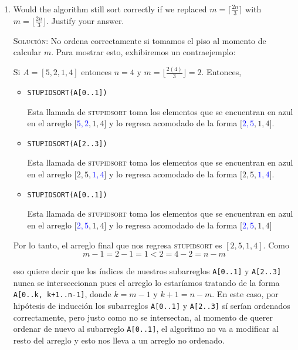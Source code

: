\documentclass[letterpaper,11pt]{article}
\begin{document}
\begin{enumerate}
\begin{enumerate}
\begin{proof}
        \end{proof}

        \item Would the algorithm still sort correctly if we replaced 
        $m = \lceil \frac{2n}{3}\rceil$ with $m = \lfloor \frac{2n}{3} \rfloor$. 
        Justify your answer.

        \textsc{Solución:} No ordena correctamente si tomamos el piso al momento 
        de calcular $m$. Para mostrar esto, exhibiremos un contraejemplo:

        Si $A = [5, 2, 1, 4]$ entonces $n = 4$ y $m = \lfloor \frac{2(4)}{3} 
        \rfloor = 2$. Entonces,
        \begin{itemize}
            \item \texttt{STUPIDSORT(A[0..1])}

            Esta llamada de \textsc{stupidsort} toma los elementos que se 
            encuentran en azul en el arreglo $[$\textcolor{blue}{$5,2$}$,1,4]$ 
            y lo regresa acomodado de la forma $[$\textcolor{blue}{$2,5$}$,1,4]$.

            \item \texttt{STUPIDSORT(A[2..3])}

            Esta llamada de \textsc{stupidsort} toma los elementos que se 
            encuentran en azul en el arreglo $[2,5,$\textcolor{blue}{$1,4$}$]$
            y lo regresa acomodado de la forma $[2,5,$\textcolor{blue}{$1,4$}$]$.

            \item \texttt{STUPIDSORT(A[0..1])}
            
            Esta llamada de \textsc{stupidsort} toma los elementos que se 
            encuentran en azul en el arreglo $[$\textcolor{blue}{$2,5$}$,1,4]$ 
            y lo regresa acomodado de la forma $[$\textcolor{blue}{$2,5$}$,1,4]$
        \end{itemize}

        Por lo tanto, el arreglo final que nos regresa \textsc{stupidsort} es 
        $[2, 5, 1, 4]$. Como 
        \begin{equation*}
            m - 1 =  2- 1 = 1 < 2 = 4 - 2 = n - m
        \end{equation*}

        eso quiere decir que los índices de nuestros subarreglos \texttt{A[0..1]}
        y \texttt{A[2..3]} nunca se interseccionan pues el arreglo lo estaríamos 
        tratando de la forma \texttt{A[0..k, k+1..n-1]}, donde $k = m - 1$ y 
        $k+1 = n-m$. En este caso, por hipótesis de inducción los subarreglos 
        \texttt{A[0..1]} y \texttt{A[2..3]} sí serían ordenados correctamente,
        pero justo como no se intersectan, al momento de querer ordenar de nuevo 
        al subarreglo \texttt{A[0..1]}, el algoritmo no va a modificar al resto 
        del arreglo y esto nos lleva a un arreglo no ordenado.


\end{enumerate}
\end{enumerate}
\end{document}
